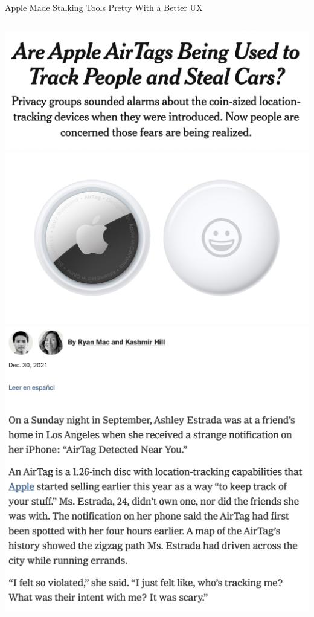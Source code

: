 \documentclass[nobackground,dvipsnames,table]{beamer}
\begin{document}
\begin{frame}{Apple Made Stalking Tools Pretty With a Better UX}
    \begin{columns}
            \includegraphics[width=\textwidth]{airtags-nyt-headline}
            \includegraphics[width=\textwidth]{airtags}
            \includegraphics[width=\textwidth]{airtags-nyt-article}
    \end{columns}
\end{frame}
\end{document}
